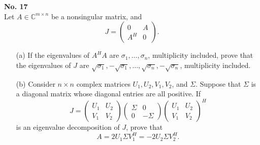 \documentclass[a4paper, 11pt]{article}
\newenvironment{problem}[2][No.]
    { \begin{mdframed}[backgroundcolor=gray!5] \textbf{#1 #2} \\}
    {  \end{mdframed}}
\begin{document}
\begin{problem}{17}
	Let \( A \in \mathbb{C}^{m \times n} \) be a nonsingular matrix, and
	$$
	J = \begin{pmatrix} 0 & A \\ A^H & 0 \end{pmatrix}.
	$$
	\begin{enumerate}
		\item[(a)] If the eigenvalues of \( A^H A \) are \( \sigma_1, \ldots, \sigma_n \), multiplicity included, prove that the eigenvalues of \( J \) are \( \sqrt{\sigma_1}, -\sqrt{\sigma_1}, \ldots, \sqrt{\sigma_n}, -\sqrt{\sigma_n} \), multiplicity included.
		\item[(b)] Consider \( n \times n \) complex matrices \( U_1, U_2, V_1, V_2 \), and \( \Sigma \). Suppose that \( \Sigma \) is a diagonal matrix whose diagonal entries are all positive. If
		$$
		J = \begin{pmatrix} U_1 & U_2 \\ V_1 & V_2 \end{pmatrix} \begin{pmatrix} \Sigma & 0 \\ 0 & -\Sigma \end{pmatrix} \begin{pmatrix} U_1 & U_2 \\ V_1 & V_2 \end{pmatrix}^H
		$$
		is an eigenvalue decomposition of \( J \), prove that
		$$
		A = 2 U_1 \Sigma V_1^H = -2 U_2 \Sigma V_2^H.
		$$
	\end{enumerate}
\end{problem}
\end{document}
